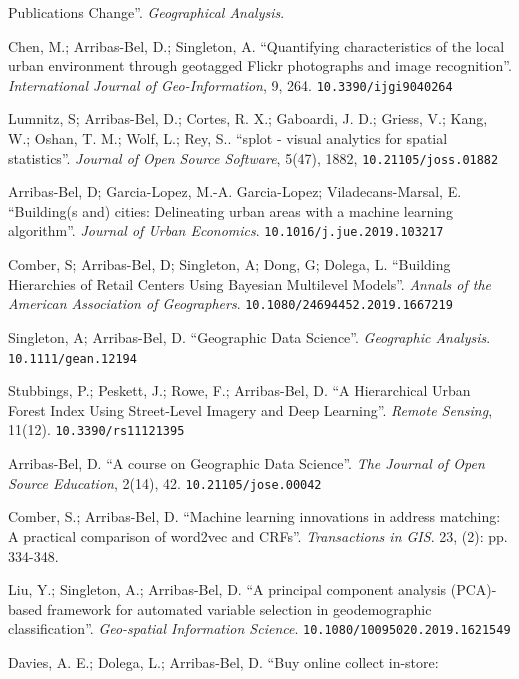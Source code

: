 \documentclass[12pt,2up]{article}
\begin{document}
\begin{cv}{}
\begin{cvlist}{Publications}
    Change''.
    \emph{Geographical Analysis}.
\item[] 
    Chen, M.; Arribas-Bel, D.; Singleton, A. ``Quantifying
    characteristics of the local urban environment through geotagged Flickr
    photographs and image recognition''. \emph{International Journal of
    Geo-Information}, 9, 264. \texttt{10.3390/ijgi9040264}
\item[] 
    Lumnitz, S; Arribas-Bel, D.; Cortes, R. X.; Gaboardi, J. D.; Griess, V.;
    Kang, W.; Oshan, T. M.; Wolf, L.; Rey, S.. ``splot - visual
    analytics for spatial statistics''. \emph{Journal of Open Source Software},
    5(47), 1882,
    \texttt{10.21105/joss.01882}
\item[\textit{2019}] 
    Arribas-Bel, D; Garcia-Lopez, M.-A. Garcia-Lopez; Viladecans-Marsal, E.
    ``Building(s and) cities: Delineating urban areas with a machine learning
    algorithm''.
    \emph{Journal of Urban Economics}.
    \texttt{10.1016/j.jue.2019.103217}
\item[] 
    Comber, S; Arribas-Bel, D; Singleton, A; Dong, G; Dolega, L.
    ``Building Hierarchies of Retail Centers Using Bayesian Multilevel
    Models''.
    \emph{Annals of the American Association of Geographers}.
    \texttt{10.1080/24694452.2019.1667219}
\item[] 
    Singleton, A; Arribas-Bel, D. ``Geographic Data Science''.
    \emph{Geographic Analysis}. \texttt{10.1111/gean.12194}
\item[] 
    Stubbings, P.; Peskett, J.; Rowe, F.; Arribas-Bel, D.
    ``A Hierarchical Urban Forest Index Using Street-Level Imagery and Deep
    Learning''.
    \emph{Remote Sensing}, 11(12). \texttt{10.3390/rs11121395}
\item[] 
    Arribas-Bel, D. ``A course on Geographic Data Science''.
    \emph{The Journal of Open Source Education}, 2(14), 42. \texttt{10.21105/jose.00042}
\item[] 
    Comber, S.; Arribas-Bel, D. ``Machine learning innovations in address
    matching: A practical comparison of word2vec and CRFs''.
    \emph{Transactions in GIS}. 23, (2): pp. 334-348.
\item[] 
    Liu, Y.; Singleton, A.; Arribas-Bel, D. ``A principal component analysis
    (PCA)-based framework for automated variable selection in geodemographic
    classification''.
    \emph{Geo-spatial Information Science}.
    \texttt{10.1080/10095020.2019.1621549}
\item[] 
    Davies, A. E.; Dolega, L.; Arribas-Bel, D. ``Buy online collect in-store:

\end{cvlist}
\end{cv}
\end{document}
